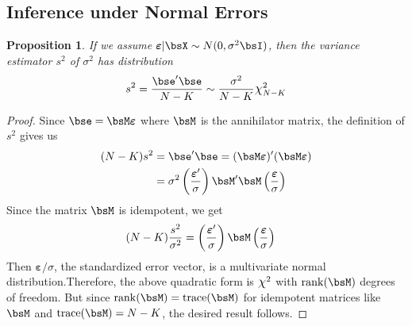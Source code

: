 \documentclass[12pt]{article}
\theoremstyle{plain}
\newtheorem{prop}[thm]{Proposition}
\theoremstyle{definition}
\theoremstyle{remark}
\newcommand*{\Chi}{\mbox{\large$\chi$}} %
\newcommand{\bsvarepsilon}{\boldsymbol{\varepsilon}}
\newcommand{\rank}{\operatorname{rank}}
\newcommand{\trace}{\operatorname{trace}}
\begin{document}
\subsection{Inference under Normal Errors}

\begin{prop}
If we assume
$\bsvarepsilon|\bsX\sim N(0,\sigma^2\bsI)$, then the variance estimator
$s^2$ of $\sigma^2$ has distribution
\begin{align}
  s^2
  = \frac{\bse'\bse}{N-K}
  \sim \frac{\sigma^2}{N-K} \Chi^2_{N-K}
  \label{s2dist}
\end{align}
\end{prop}
\begin{proof}
Since $\bse=\bsM\bsvarepsilon$ where $\bsM$ is the annihilator matrix,
the definition of $s^2$ gives us
\begin{align*}
  (N-K) s^2
  &= \bse' \bse
  = (\bsM\bsvarepsilon)' (\bsM\bsvarepsilon)\\
  &= \sigma^2 \left(\frac{\bsvarepsilon'}{\sigma}\right)\bsM'
    \bsM\left(\frac{\bsvarepsilon}{\sigma}\right)
\end{align*}
Since the matrix $\bsM$ is idempotent, we get
\begin{align*}
  (N-K) \frac{s^2}{\sigma^2}
  &= \left(\frac{\bsvarepsilon'}{\sigma}\right)
    \bsM\left(\frac{\bsvarepsilon}{\sigma}\right)
\end{align*}
Then $\bsvarepsilon/\sigma$, the standardized error vector, is a
multivariate normal distribution.Therefore, the above quadratic form is
$\Chi^2$ with $\rank(\bsM)$ degrees of freedom. But since
$\rank(\bsM)=\trace(\bsM)$ for idempotent matrices like $\bsM$ and
$\trace(\bsM)=N-K$, the desired result follows.
\end{proof}
\end{document}
